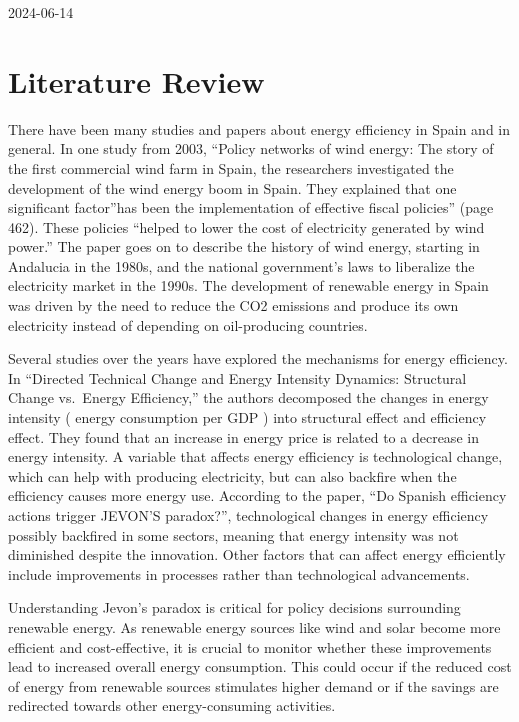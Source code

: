 \documentclass[
]{report}
\begin{document}
2024-06-14

\hypertarget{literature-review}{%
\chapter{Literature Review}\label{literature-review}}

There have been many studies and papers about energy efficiency in Spain
and in general. In one study from 2003, ``Policy networks of wind
energy: The story of the first commercial wind farm in Spain, the
researchers investigated the development of the wind energy boom in
Spain. They explained that one significant factor''has been the
implementation of effective fiscal policies'' (page 462). These policies
``helped to lower the cost of electricity generated by wind power.'' The
paper goes on to describe the history of wind energy, starting in
Andalucia in the 1980s, and the national government's laws to liberalize
the electricity market in the 1990s. The development of renewable energy
in Spain was driven by the need to reduce the CO2 emissions and produce
its own electricity instead of depending on oil-producing countries.

Several studies over the years have explored the mechanisms for energy
efficiency. In ``Directed Technical Change and Energy Intensity
Dynamics: Structural Change vs.~Energy Efficiency,'' the authors
decomposed the changes in energy intensity ( energy consumption per GDP
) into structural effect and efficiency effect. They found that an
increase in energy price is related to a decrease in energy intensity. A
variable that affects energy efficiency is technological change, which
can help with producing electricity, but can also backfire when the
efficiency causes more energy use. According to the paper, ``Do Spanish
efficiency actions trigger JEVON'S paradox?'', technological changes in
energy efficiency possibly backfired in some sectors, meaning that
energy intensity was not diminished despite the innovation. Other
factors that can affect energy efficiently include improvements in
processes rather than technological advancements.

Understanding Jevon's paradox is critical for policy decisions
surrounding renewable energy. As renewable energy sources like wind and
solar become more efficient and cost-effective, it is crucial to monitor
whether these improvements lead to increased overall energy consumption.
This could occur if the reduced cost of energy from renewable sources
stimulates higher demand or if the savings are redirected towards other
energy-consuming activities.
\end{document}
